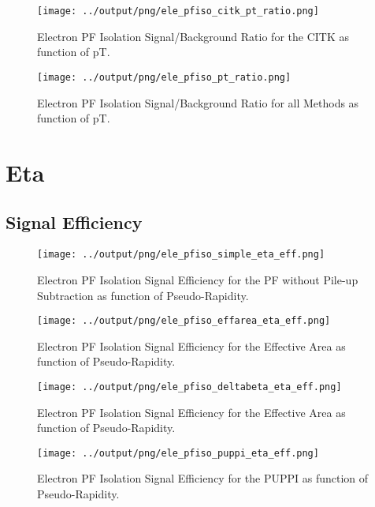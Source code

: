 \documentclass[11pt]{book}
\begin{document}
\begin{figure}[htb]
\centering
\texttt{[image: ../output/png/ele\_pfiso\_citk\_pt\_ratio.png]}
\caption{Electron PF Isolation Signal/Background Ratio for the CITK as function of pT.}
\label{fig:ele_pfiso_pt_ratio_citk}
\end{figure}


\begin{figure}[htb]
\centering
\texttt{[image: ../output/png/ele\_pfiso\_pt\_ratio.png]}
\caption{Electron PF Isolation Signal/Background Ratio for all Methods as function of pT.}
\label{fig:ele_pfiso_pt_ratio}
\end{figure}
\clearpage


\section{Eta}

\subsection{Signal Efficiency}
\begin{figure}[htb]
\centering
\texttt{[image: ../output/png/ele\_pfiso\_simple\_eta\_eff.png]}
\caption{Electron PF Isolation Signal Efficiency for the PF without Pile-up Subtraction as function of Pseudo-Rapidity.}
\label{fig:ele_pfiso_eta_eff_simple}
\end{figure}

\begin{figure}[htb]
\centering
\texttt{[image: ../output/png/ele\_pfiso\_effarea\_eta\_eff.png]}
\caption{Electron PF Isolation Signal Efficiency for the Effective Area as function of Pseudo-Rapidity.}
\label{fig:ele_pfiso_eta_eff_effarea}
\end{figure}

\begin{figure}[htb]
\centering
\texttt{[image: ../output/png/ele\_pfiso\_deltabeta\_eta\_eff.png]}
\caption{Electron PF Isolation Signal Efficiency for the Effective Area as function of Pseudo-Rapidity.}
\label{fig:ele_pfiso_eta_eff_deltabeta}
\end{figure}

\begin{figure}[htb]
\centering
\texttt{[image: ../output/png/ele\_pfiso\_puppi\_eta\_eff.png]}
\caption{Electron PF Isolation Signal Efficiency for the PUPPI as function of Pseudo-Rapidity.}
\label{fig:ele_pfiso_eta_eff_puppi}
\end{figure}
\end{document}
